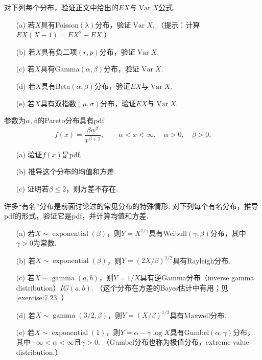 \begin{exercise}\label{exercise:3.22}
对下列每个分布，验证正文中给出的$EX$与$\operatorname{Var}X$公式.
\begin{enumerate}
\item[(a)] 若$X$具有Poisson$(\lambda)$分布，验证$\operatorname{Var}X$. （提示：计算$EX(X-1)=EX^2-EX$.）
\item[(b)] 若$X$具有负二项$(r,p)$分布，验证$\operatorname{Var}X$.
\item[(c)] 若$X$具有Gamma$(\alpha,\beta)$分布，验证$\operatorname{Var}X$.
\item[(d)] 若$X$具有Beta$(\alpha,\beta)$分布，验证$EX$与$\operatorname{Var}X$.
\item[(e)] 若$X$具有双指数$(\mu,\sigma)$分布，验证$EX$与$\operatorname{Var}X$.
\end{enumerate}
\end{exercise}
\begin{exercise}\label{exercise:3.23}
参数为$\alpha,\beta$的Pareto分布具有pdf
$$f(x)=\frac{\beta\alpha^\beta}{x^{\beta+1}},\qquad\alpha<x<\infty,\quad\alpha>0,\quad\beta>0.$$
\begin{enumerate}
\item[(a)] 验证$f(x)$是pdf.
\item[(b)] 推导这个分布的均值和方差.
\item[(c)] 证明若$\beta\le2$，则方差不存在.
\end{enumerate}
\end{exercise}
\begin{exercise}\label{exercise:3.24}
许多“有名”分布是前面讨论过的常见分布的特殊情形. 对下列每个有名分布，推导pdf的形式，验证它是pdf，并计算均值和方差.
\begin{enumerate}
\item[(a)] 若$X\sim\operatorname{exponential}(\beta)$，则$Y=X^{1/\gamma}$具有Weibull$(\gamma,\beta)$分布，其中$\gamma>0$为常数.
\item[(b)] 若$X\sim\operatorname{exponential}(\beta)$，则$Y=(2X/\beta)^{1/2}$具有Rayleigh分布.
\item[(c)] 若$X\sim\operatorname{gamma}(a,b)$，则$Y=1/X$具有逆Gamma分布（inverse gamma distribution）$IG(a,b)$. （这个分布在方差的Bayes估计中有用；见\autoref{exercise:7.23}.）
\item[(d)] 若$X\sim\operatorname{gamma}(3/2,\beta)$，则$Y=(X/\beta)^{1/2}$具有Maxwell分布.
\item[(e)] 若$X\sim\operatorname{exponential}(1)$，则$Y=\alpha-\gamma\log X$具有Gumbel$(\alpha,\gamma)$分布，其中$-\infty<\alpha<\infty$且$\gamma>0$. （Gumbel分布也称为极值分布，extreme value distribution.）
\end{enumerate}
\end{exercise}
